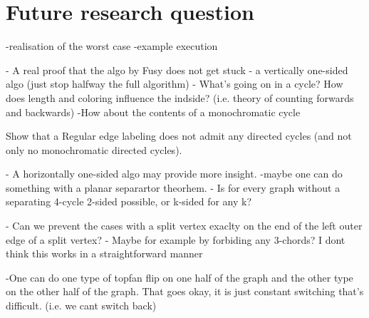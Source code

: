 \section{Future research question}

-realisation of the worst case
-example execution


- A real proof that the algo by Fusy does not get stuck
- a vertically one-sided algo (just stop halfway the full algorithm)
- What's going on in a cycle? How does length and coloring influence the indside? (i.e. theory of counting forwards and backwards)
  -How about the contents of a monochromatic cycle

Show that a Regular edge labeling does not admit any directed cycles (and not only no monochromatic directed cycles).

- A horizontally one-sided algo may provide more insight.
-maybe one can do something with a planar separartor theorhem.
- Is for every graph without a separating 4-cycle 2-sided possible, or k-sided for any k?

- Can we prevent the cases with a split vertex exaclty on the end of the left outer edge of a split vertex?
      - Maybe for example by forbiding any 3-chords? I dont think this works in a straightforward manner

-One can do one type of topfan flip on one half of the graph and the other type on the other half of the graph. That goes okay, it is just constant switching that's difficult. (i.e. we cant switch back)
